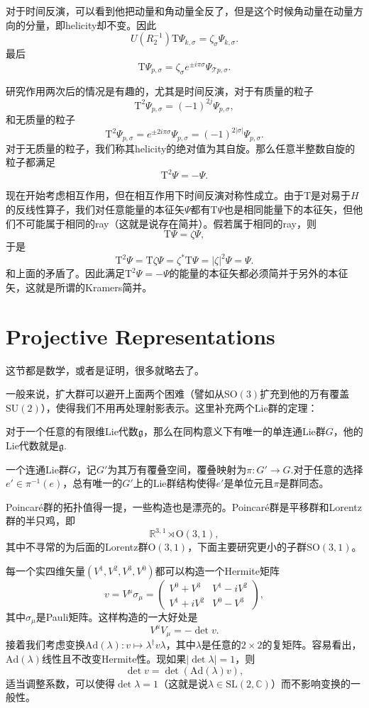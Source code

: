 \documentclass[9pt]{extbook}
\begin{document}
对于时间反演，可以看到他把动量和角动量全反了，但是这个时候角动量在动量方向的分量，即helicity却不变。因此
\[
U(R_2^{-1})\mathrm{T}\Psi_{k,\sigma}=\zeta_{\sigma}\Psi_{k,\sigma}.
\]
最后
\[
\mathrm{T}\Psi_{p,\sigma}=\zeta_{\sigma}e^{\pm i\pi\sigma}\Psi_{\mathscr{T}p,\sigma}.
\]

研究作用两次后的情况是有趣的，尤其是时间反演，对于有质量的粒子
\[
\mathrm{T}^2\Psi_{p,\sigma}=(-1)^{2j}\Psi_{p,\sigma},
\]
和无质量的粒子
\[
\mathrm{T}^2\Psi_{p,\sigma}=e^{\pm 2i\pi\sigma}\Psi_{p,\sigma}=(-1)^{2|\sigma|}\Psi_{p,\sigma}.
\]
对于无质量的粒子，我们称其helicity的绝对值为其自旋。那么任意半整数自旋的粒子都满足
\[
\mathrm{T}^2\Psi=-\Psi.
\]

现在开始考虑相互作用，但在相互作用下时间反演对称性成立。由于$\mathrm{T}$是对易于$H$的反线性算子，我们对任意能量的本征矢$\Psi$都有$\mathrm{T}\Psi$也是相同能量下的本征矢，但他们不可能属于相同的ray（这就是说存在简并）。假若属于相同的ray，则
\[
\mathrm{T}\Psi=\zeta\Psi,
\]
于是
\[
\mathrm{T}^2\Psi=\mathrm{T}\zeta\Psi=\zeta^*\mathrm{T}\Psi=|\zeta|^2\Psi=\Psi.
\]
和上面的矛盾了。因此满足$\mathrm{T}^2\Psi=-\Psi$的能量的本征矢都必须简并于另外的本征矢，这就是所谓的Kramers简并。
\section{Projective Representations}
这节都是数学，或者是证明，很多就略去了。

一般来说，扩大群可以避开上面两个困难（譬如从$\mathrm{SO}(3)$扩充到他的万有覆盖$\mathrm{SU}(2)$），使得我们不用再处理射影表示。这里补充两个Lie群的定理：
\begin{theo}
对于一个任意的有限维Lie代数$\mathfrak{g}$，那么在同构意义下有唯一的单连通Lie群$G$，他的Lie代数就是$\mathfrak{g}$.
\end{theo}
\begin{theo}
一个连通Lie群$G$，记$G'$为其万有覆叠空间，覆叠映射为$\pi:G'\to G$.对于任意的选择$e'\in \pi^{-1}(e)$，总有唯一的$G'$上的Lie群结构使得$e'$是单位元且$\pi$是群同态。
\end{theo}
Poincar\'{e}群的拓扑值得一提，一些构造也是漂亮的。Poincar\'{e}群是平移群和Lorentz群的半只鸡，即
\[
\mathbb{R}^{3,1} \rtimes \mathrm{O}(3,1),
\]
其中不寻常的为后面的Lorentz群$\mathrm{O}(3,1)$，下面主要研究更小的子群$\mathrm{SO}(3,1)$。

每一个实四维矢量$(V^1,	V^2,V^3,V^0)$都可以构造一个Hermite矩阵
\[v=V^\mu\sigma_\mu=
\begin{pmatrix}
V^0+V^3&V^1-iV^2\\
V^1+iV^2&V^0-V^3
\end{pmatrix},
\]
其中$\sigma_\mu$是Pauli矩阵。这样构造的一大好处是
\[
V^\mu V_\mu=-\det v.
\]
接着我们考虑变换$\mathrm{Ad}(\lambda):v\mapsto \lambda^\dag v \lambda$，其中$ \lambda$是任意的$2\times2$的复矩阵。容易看出，$\mathrm{Ad}(\lambda)$线性且不改变Hermite性。现如果$|\det \lambda|=1$，则
\[
\det v=\det(\mathrm{Ad}(\lambda)v),
\]
适当调整系数，可以使得$\det \lambda=1$（这就是说$\lambda\in \mathrm{SL}(2,\mathbb{C})$）而不影响变换的一般性。
\end{document}
